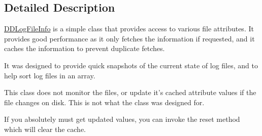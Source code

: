 \subsection{Detailed Description}
\hyperlink{interface_d_d_log_file_info}{D\-D\-Log\-File\-Info} is a simple class that provides access to various file attributes. It provides good performance as it only fetches the information if requested, and it caches the information to prevent duplicate fetches.

It was designed to provide quick snapshots of the current state of log files, and to help sort log files in an array.

This class does not monitor the files, or update it's cached attribute values if the file changes on disk. This is not what the class was designed for.

If you absolutely must get updated values, you can invoke the reset method which will clear the cache. 

